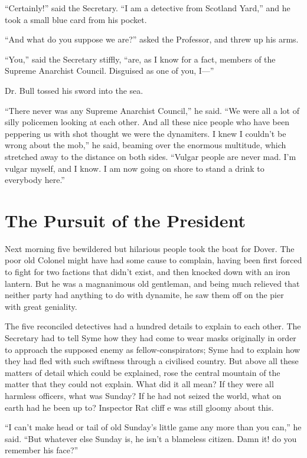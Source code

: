 \documentclass{book}
\begin{document}
“Certainly!” said the Secretary. “I am a detective from Scotland Yard,” and he took a small blue card from his pocket.

“And what do you suppose we are?” asked the Professor, and threw up his arms.

“You,” said the Secretary stiffly, “are, as I know for a fact, members of the Supreme Anarchist Council. Disguised as one of you, I—”

Dr. Bull tossed his sword into the sea.

“There never was any Supreme Anarchist Council,” he said. “We were all a lot of silly policemen looking at each other. And all these nice people who have been peppering us with shot thought we were the dynamiters. I knew I couldn’t be wrong about the mob,” he said, beaming over the enormous multitude, which stretched away to the distance on both sides. “Vulgar people are never mad. I’m vulgar myself, and I know. I am now going on shore to stand a drink to everybody here.”

\chapter{The Pursuit of the President}
\label{chapter-12}
Next morning five bewildered but hilarious people took the boat for Dover. The poor old Colonel might have had some cause to complain, having been first forced to fight for two factions that didn’t exist, and then knocked down with an iron lantern. But he was a magnanimous old gentleman, and being much relieved that neither party had anything to do with dynamite, he saw them off on the pier with great geniality.

The five reconciled detectives had a hundred details to explain to each other. The Secretary had to tell Syme how they had come to wear masks originally in order to approach the supposed enemy as fellow-conspirators; Syme had to explain how they had fled with such swiftness through a civilised country. But above all these matters of detail which could be explained, rose the central mountain of the matter that they could not explain. What did it all mean? If they were all harmless officers, what was Sunday? If he had not seized the world, what on earth had he been up to? Inspector Rat cliff e was still gloomy about this.

“I can’t make head or tail of old Sunday’s little game any more than you can,” he said. “But whatever else Sunday is, he isn’t a blameless citizen. Damn it! do you remember his face?”
\end{document}
